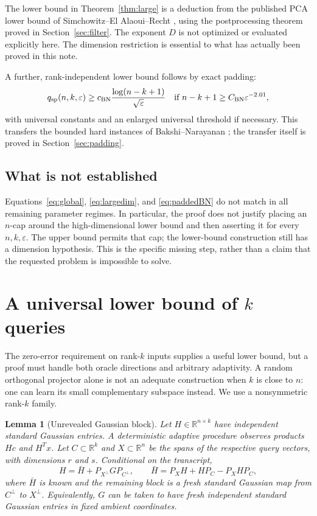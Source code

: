 \documentclass[11pt]{article}
\numberwithin{equation}{section}
\newtheorem{lemma}[theorem]{Lemma}
\theoremstyle{definition}
\newcommand{\R}{\mathbb R}
\newcommand{\qsp}{q_{\mathrm{sp}}}
\newcommand{\eps}{\varepsilon}
\begin{document}
The lower bound in Theorem~\ref{thm:large} is a deduction from the published
PCA lower bound of Simchowitz--El Alaoui--Recht \cite{SAR18}, using the
postprocessing theorem proved in Section~\ref{sec:filter}. The exponent $D$
is not optimized or evaluated explicitly here. The dimension restriction is
essential to what has actually been proved in this note.

A further, rank-independent lower bound follows by exact padding:
\begin{equation}
 \qsp(n,k,\eps)\ge c_{\rm BN}\frac{\log(n-k+1)}{\sqrt\eps}
 \quad\text{if }n-k+1\ge C_{\rm BN}\eps^{-2.01},
 \label{eq:paddedBN}
\end{equation}
with universal constants and an enlarged universal threshold if necessary.
This transfers the bounded hard instances of Bakshi--Narayanan
\cite[Theorems 1.1, 5.2, and Section 6]{BN23}; the transfer itself is proved in
Section~\ref{sec:padding}.

\subsection*{What is not established}
Equations~\eqref{eq:global}, \eqref{eq:largedim}, and \eqref{eq:paddedBN} do
not match in all remaining parameter regimes. In particular, the proof does
not justify placing an $n$-cap around the high-dimensional lower bound and
then asserting it for every $n,k,\eps$. The upper bound permits that cap;
the lower-bound construction still has a dimension hypothesis. This is the
specific missing step, rather than a claim that the requested problem is
impossible to solve.

\section{A universal lower bound of \texorpdfstring{$k$}{k} queries}
\label{sec:rank}

The zero-error requirement on rank-$k$ inputs supplies a useful lower bound,
but a proof must handle both oracle directions and arbitrary adaptivity.
A random orthogonal projector alone is not an adequate construction when
$k$ is close to $n$: one can learn its small complementary subspace instead.
We use a nonsymmetric rank-$k$ family.

\begin{lemma}[Unrevealed Gaussian block]
\label{lem:gaussian}
Let $H\in\R^{n\times k}$ have independent standard Gaussian entries.
A deterministic adaptive procedure observes products $Hc$ and $H^Tx$.
Let $C\subset\R^k$ and $X\subset\R^n$ be the spans of the respective query
vectors, with dimensions $r$ and $s$. Conditional on the transcript,
\begin{equation}
 H=\bar H+P_{X^\perp}GP_{C^\perp},\qquad
 \bar H=P_XH+HP_C-P_XHP_C,
 \label{eq:gaussblock}
\end{equation}
where $\bar H$ is known and the remaining block is a fresh standard Gaussian
map from $C^\perp$ to $X^\perp$. Equivalently, $G$ can be taken to have fresh
independent standard Gaussian entries in fixed ambient coordinates.
\end{lemma}
\end{document}
